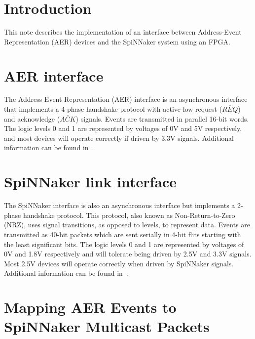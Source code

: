 
\def\FullTitle{Interfacing AER devices to SpiNNaker\\ using an FPGA}
\def\ShortTitle{SpiNNaker - AER interface}
\def\Date{03 Apr 2014}
\def\Version{1.1}
\def\Author{Luis A. Plana}
\def\Email{luis.plana@manchester.ac.uk}



\section{Introduction}


This note describes the implementation of an interface between Address-Event Representation (AER) devices and the SpiNNaker system using an FPGA. 


\section{AER interface}

The Address Event Representation (AER) interface is an asynchronous interface that implements a 4-phase handshake protocol with active-low request ($\overline{REQ}$) and acknowledge ($\overline{ACK}$) signals. Events are transmitted in parallel 16-bit words. The logic levels 0 and 1 are represented by voltages of 0V and 5V respectively, and most devices will operate correctly if driven by 3.3V signals. Additional information can be found in~\cite{AER}.


\section{SpiNNaker link interface}

The SpiNNaker interface is also an asynchronous interface but implements a 2-phase handshake protocol. This protocol, also known as Non-Return-to-Zero (NRZ), uses signal transitions, as opposed to levels, to represent data. Events are transmitted as 40-bit packets which are sent serially in 4-bit flits starting with the least significant bits. The logic levels 0 and 1 are represented by voltages of 0V and 1.8V respectively and will tolerate being driven by 2.5V and 3.3V signals. Most 2.5V devices will operate correctly when driven by SpiNNaker signals. Additional information can be found in~\cite{spinn-app-7}.


\section{Mapping AER Events to SpiNNaker Multicast Packets}


